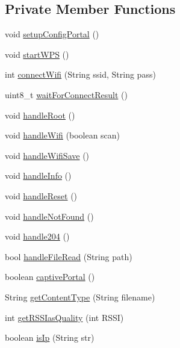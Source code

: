 \subsection*{Private Member Functions}
\begin{DoxyCompactItemize}
\item 
void \hyperlink{class_wi_fi_manager_a1743325d0dd86d011df96b22d2a0ddd6}{setup\+Config\+Portal} ()
\item 
void \hyperlink{class_wi_fi_manager_abcc403fc26a47f7a111d1271f1d0869e}{start\+W\+PS} ()
\item 
int \hyperlink{class_wi_fi_manager_ae0ae27b5543b47585728c084c3bbdca7}{connect\+Wifi} (String ssid, String pass)
\item 
uint8\+\_\+t \hyperlink{class_wi_fi_manager_a89a3f33997aa662ad223d6c150c1eede}{wait\+For\+Connect\+Result} ()
\item 
void \hyperlink{class_wi_fi_manager_a47e4c7df7478f690c53ff9f5125c9760}{handle\+Root} ()
\item 
void \hyperlink{class_wi_fi_manager_a57a9048175c1918340ab9d0a2c53601f}{handle\+Wifi} (boolean scan)
\item 
void \hyperlink{class_wi_fi_manager_a2a8c2b60aa86dfdeab8a1a90f7122dc7}{handle\+Wifi\+Save} ()
\item 
void \hyperlink{class_wi_fi_manager_ac35e46661f8a209d84bba62d9aa43a35}{handle\+Info} ()
\item 
void \hyperlink{class_wi_fi_manager_a94fb1a8fcfbd0d02714c69138bf72f9c}{handle\+Reset} ()
\item 
void \hyperlink{class_wi_fi_manager_a7d01f7de3e4b76acdabffac79fa3d0ab}{handle\+Not\+Found} ()
\item 
void \hyperlink{class_wi_fi_manager_ac924dc071144e609afcf52073176c11f}{handle204} ()
\item 
bool \hyperlink{class_wi_fi_manager_a9e802fa4ca834a622f058a7176f47806}{handle\+File\+Read} (String path)
\item 
boolean \hyperlink{class_wi_fi_manager_a4ef4298deb224212e5242c456669a973}{captive\+Portal} ()
\item 
String \hyperlink{class_wi_fi_manager_a40f123fd290c3e331c9785d19a88f3b8}{get\+Content\+Type} (String filename)
\item 
int \hyperlink{class_wi_fi_manager_ae71cfd6bd70ada2ca02e1d20b152d0e5}{get\+R\+S\+S\+Ias\+Quality} (int R\+S\+SI)
\item 
boolean \hyperlink{class_wi_fi_manager_a9c78a8774f746ec22a99d03a53baa607}{is\+Ip} (String str)
\item 

\end{DoxyCompactItemize}
